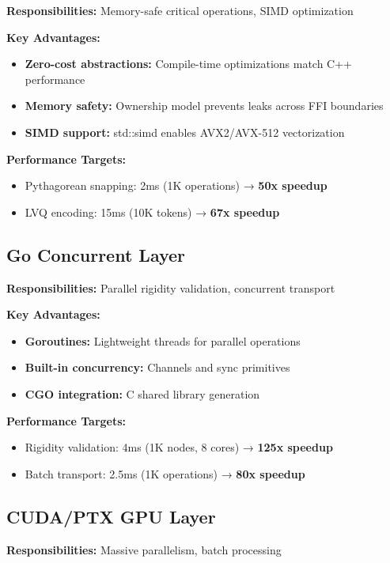 \documentclass{article}
\begin{document}
\textbf{Responsibilities:} Memory-safe critical operations, SIMD optimization

\textbf{Key Advantages:}
\begin{itemize}
    \item \textbf{Zero-cost abstractions:} Compile-time optimizations match C++ performance
    \item \textbf{Memory safety:} Ownership model prevents leaks across FFI boundaries
    \item \textbf{SIMD support:} std::simd enables AVX2/AVX-512 vectorization
\end{itemize}

\textbf{Performance Targets:}
\begin{itemize}
    \item Pythagorean snapping: 2ms (1K operations) → \textbf{50x speedup}
    \item LVQ encoding: 15ms (10K tokens) → \textbf{67x speedup}
\end{itemize}

\subsection{Go Concurrent Layer}

\textbf{Responsibilities:} Parallel rigidity validation, concurrent transport

\textbf{Key Advantages:}
\begin{itemize}
    \item \textbf{Goroutines:} Lightweight threads for parallel operations
    \item \textbf{Built-in concurrency:} Channels and sync primitives
    \item \textbf{CGO integration:} C shared library generation
\end{itemize}

\textbf{Performance Targets:}
\begin{itemize}
    \item Rigidity validation: 4ms (1K nodes, 8 cores) → \textbf{125x speedup}
    \item Batch transport: 2.5ms (1K operations) → \textbf{80x speedup}
\end{itemize}

\subsection{CUDA/PTX GPU Layer}

\textbf{Responsibilities:} Massive parallelism, batch processing
\end{document}
